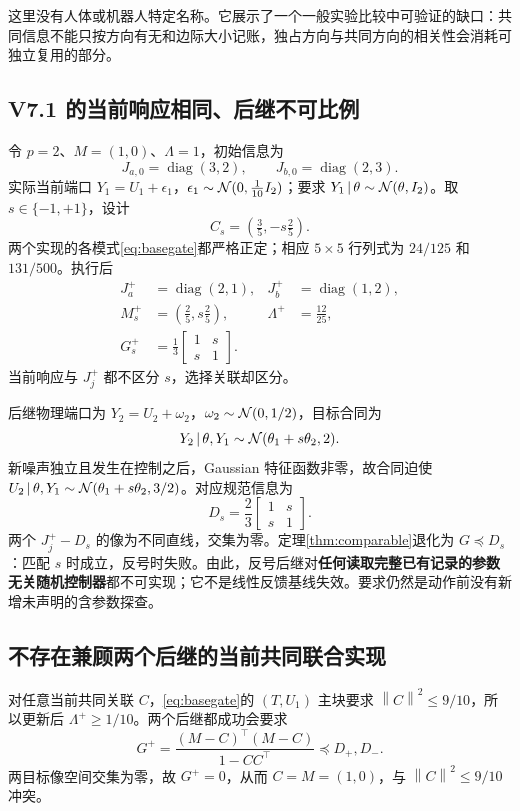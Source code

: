 \documentclass[UTF8,fontset=fandol,11pt,a4paper]{ctexart}
\DeclareMathOperator{\diag}{diag}\DeclareMathOperator{\tr}{tr}\DeclareMathOperator{\TV}{TV}
\newcommand{\norm}[1]{\left\lVert#1\right\rVert}\newcommand{\gam}[1]{\gamma_{#1}}
\theoremstyle{definition}\newtheorem{definition}[theorem]{定义}\newtheorem{assumption}[theorem]{条件}
\numberwithin{equation}{section}
\begin{document}
这里没有人体或机器人特定名称。它展示了一个一般实验比较中可验证的缺口：共同信息不能只按方向有无和边际大小记账，独占方向与共同方向的相关性会消耗可独立复用的部分。

\subsection{V7.1 的当前响应相同、后继不可比例}
令 $p=2$、$M=(1,0)$、$\Lambda=1$，初始信息为
\[
J_{a,0}=\diag(3,2),\qquad J_{b,0}=\diag(2,3).
\]
实际当前端口 $Y_1=U_1+\epsilon_1$，$\epsilon_1\sim\mathcal N(0,\tfrac1{10}I_2)$；要求 $Y_1\,|\,\theta\sim\mathcal N(\theta,I_2)$。取 $s\in\{-1,+1\}$，设计
\begin{equation}
C_s=(\tfrac35,-s\tfrac25).
\end{equation}
两个实现的各模式\eqref{eq:basegate}都严格正定；相应 $5\times5$ 行列式为 $24/125$ 和 $131/500$。执行后
\begin{align}
J_a^+&=\diag(2,1),&J_b^+&=\diag(1,2),\\
M_s^+&=(\tfrac25,s\tfrac25),&\Lambda^+&=\tfrac{12}{25},\\
G_s^+&=\tfrac13\begin{bmatrix}1&s\\s&1\end{bmatrix}.
\end{align}
当前响应与 $J_j^+$ 都不区分 $s$，选择关联却区分。

后继物理端口为 $Y_2=U_2+\omega_2$，$\omega_2\sim\mathcal N(0,1/2)$，目标合同为
\begin{equation}
Y_2\,|\,\theta,Y_1\sim\mathcal N(\theta_1+s\theta_2,2).
\label{eq:futures}
\end{equation}
新噪声独立且发生在控制之后，Gaussian 特征函数非零，故合同迫使
$U_2\,|\,\theta,Y_1\sim\mathcal N(\theta_1+s\theta_2,3/2)$。对应规范信息为
\begin{equation}
D_s=\frac23\begin{bmatrix}1&s\\s&1\end{bmatrix}.
\end{equation}
两个 $J_j^+-D_s$ 的像为不同直线，交集为零。定理\ref{thm:comparable}退化为 $G\preceq D_s$：匹配 $s$ 时成立，反号时失败。由此，反号后继对\textbf{任何读取完整已有记录的参数无关随机控制器}都不可实现；它不是线性反馈基线失效。要求仍然是动作前没有新增未声明的含参数探查。

\subsection{不存在兼顾两个后继的当前共同联合实现}
对任意当前共同关联 $C$，\eqref{eq:basegate}的 $(T,U_1)$ 主块要求 $\norm C^2\le9/10$，所以更新后 $\Lambda^+\ge1/10$。两个后继都成功会要求
\[
G^+=\frac{(M-C)^\top(M-C)}{1-CC^\top}\preceq D_+,D_-.
\]
两目标像空间交集为零，故 $G^+=0$，从而 $C=M=(1,0)$，与 $\norm C^2\le9/10$ 冲突。
\end{document}
